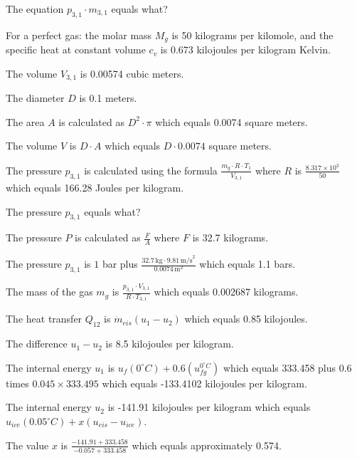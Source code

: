 The equation \( p_{3,1} \cdot m_{3,1} \) equals what?

For a perfect gas: the molar mass \( M_g \) is 50 kilograms per kilomole, and the specific heat at constant volume \( c_v \) is 0.673 kilojoules per kilogram Kelvin.

The volume \( V_{3,1} \) is 0.00574 cubic meters.

The diameter \( D \) is 0.1 meters.

The area \( A \) is calculated as \( D^2 \cdot \pi \) which equals 0.0074 square meters.

The volume \( V \) is \( D \cdot A \) which equals \( D \cdot 0.0074 \) square meters.

The pressure \( p_{3,1} \) is calculated using the formula \( \frac{m_g \cdot R \cdot T_1}{V_{3,1}} \) where \( R \) is \( \frac{8.317 \times 10^3}{50} \) which equals 166.28 Joules per kilogram.

The pressure \( p_{3,1} \) equals what?

The pressure \( P \) is calculated as \( \frac{F}{A} \) where \( F \) is 32.7 kilograms.

The pressure \( p_{3,1} \) is \( 1 \) bar plus \( \frac{32.7 \, \text{kg} \cdot 9.81 \, \text{m/s}^2}{0.0074 \, \text{m}^2} \) which equals 1.1 bars.

The mass of the gas \( m_g \) is \( \frac{p_{3,1} \cdot V_{3,1}}{R \cdot T_{3,1}} \) which equals 0.002687 kilograms.

The heat transfer \( Q_{12} \) is \( \dot{m}_{eis} (u_1 - u_2) \) which equals 0.85 kilojoules.

The difference \( u_1 - u_2 \) is 8.5 kilojoules per kilogram.

The internal energy \( u_1 \) is \( u_f(0^\circ C) + 0.6 \left( u_{fg}^{0^\circ C} \right) \) which equals 333.458 plus 0.6 times \( 0.045 \times 333.495 \) which equals -133.4102 kilojoules per kilogram.

The internal energy \( u_2 \) is -141.91 kilojoules per kilogram which equals \( u_{ice}(0.05^\circ C) + x \left( u_{eis} - u_{ice} \right) \).

The value \( x \) is \( \frac{-141.91 + 333.458}{-0.057 + 333.458} \) which equals approximately 0.574.
